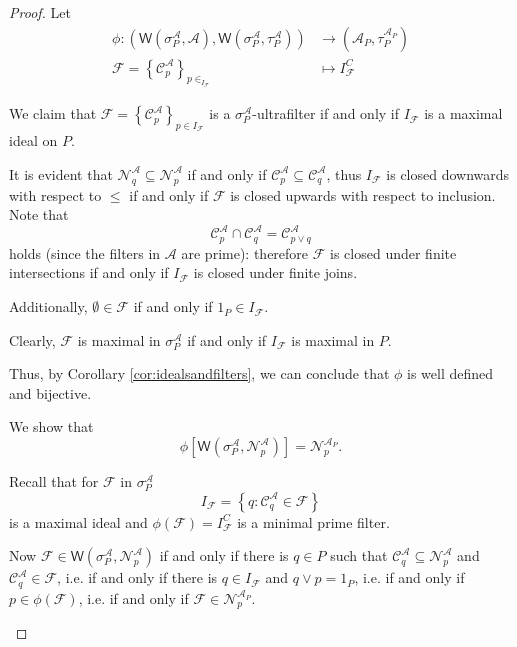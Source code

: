 \documentclass[10pt,a4paper]{amsart}
\newcommand{\aaa}{\mathcal{A} }
\newcommand{\bp}[1]{\left\lbrace #1 \right\rbrace}
\newcommand{\closed}[1]{\mathcal{C}^{\mathcal{A}}_{#1}}
\newcommand{\open}[1]{\mathcal{N}^{\mathcal{A}}_{#1}}
\newcommand{\spa}{\sigma^\aaa_P}
\newcommand{\wall}[2]{\mathsf{W}(#1,#2)}
\begin{document}
\begin{proof}
Let 
\begin{align*}
    \phi: (\wall{\spa}{\aaa},\wall{\spa}{\tau^\aaa_P} ) &\to (\aaa_P, \tau^{\aaa_P}_P)\\
    \mathcal{F}=\bp{\closed{p}}_{p \in _{I_\mathcal{F}}}&\mapsto I_\mathcal{F}^C
\end{align*} 
\begin{description}[font=\normalfont\itshape]
        \item[$\phi$ is well defined and bijective.]
        We claim that $\mathcal{F}=\bp{\closed{p}}_{p \in I_{\mathcal{F}}}$ is a $\spa$-ultrafilter if and only if $I_{\mathcal{F}}$ is a maximal ideal on $P$. 
        
     It is evident that $\open{q} \subseteq \open{p}$ if and only if $\closed{p}\subseteq \closed{q}$, thus $I_{\mathcal{F}}$ is closed downwards with respect to $\leq$ if and only if $\mathcal{F}$ is closed upwards with respect to inclusion. Note that 
\[
\closed{p} \cap \closed{q} = \closed{p \vee q}
\]
holds (since the filters in $\mathcal{A}$ are prime): therefore $\mathcal{F}$ is closed under finite intersections if and only if $I_{\mathcal{F}}$ is closed under finite joins. 

Additionally, $\emptyset \in \mathcal{F}$ if and only if $1_P \in I_{\mathcal{F}}$.

Clearly, $\mathcal{F}$ is maximal in $\spa$ if and only if $I_{\mathcal{F}}$ is maximal in $P$.

 Thus, by Corollary \ref{cor:idealsandfilters}, we can conclude that $\phi$ is well defined and bijective.  
 
        \item[$\phi$ is  open and continuous.]
We show that 
\[
\phi[\wall{\spa}{\open{p}}]
=\mathcal{N}^{\aaa_P}_p.
\] 


Recall that for $\mathcal{F}$ in $\spa$
\[
I_{\mathcal{F}}=\bp{q: \closed{q}\in\mathcal{F}}
\]
is a maximal ideal and $\phi(\mathcal{F})=I_\mathcal{F}^C$ is a minimal prime filter.

Now $\mathcal{F} \in \wall{\spa}{\open{p}}$ if and only if there is
$q \in P$ such that $\closed{q}\subseteq\open{p}$ and $\closed{q} \in \mathcal{F}$, i.e. if and only if there is $q\in I_\mathcal{F}$ and $q\vee p=1_P$, i.e. if and only if $p \in \phi(\mathcal{F})$, i.e. if and only if
$\mathcal{F} \in \mathcal{N}^{\aaa_P}_p$.



\end{description}
\end{proof}
\end{document}
